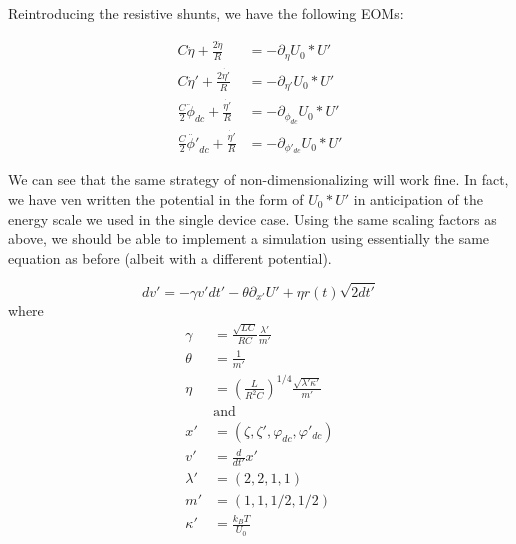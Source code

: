 \documentclass[paper=a4, twocolumn, fontsize=10pt]{article} %
\numberwithin{equation}{section} %
\numberwithin{figure}{section} %
\numberwithin{table}{section} %
\begin{document}
Reintroducing the resistive shunts, we have the following EOMs:

\begin{align*}
    C \ddot{\eta} + \frac{2 \dot{\eta}}{R} &= -\partial_{\eta} U_0 * U' \\
    C \ddot{\eta}' + \frac{2 \dot{\eta'}}{R}  &= -\partial_{\eta'} U_0 * U' \\
\frac{C}{2} \ddot{\phi}_{dc} + \frac{\dot{\eta'}}{R} &= -\partial_{\phi_{dc}} U_0 * U' \\
\frac{C}{2} \ddot{\phi'}_{dc} + \frac{\dot{\eta'}}{R} &= -\partial_{\phi'_{dc}} U_0 * U'
\end{align*}

We can see that the same strategy of non-dimensionalizing will work fine. In fact, we have ven written the potential in the form of $U_0 * U'$ in anticipation of the energy scale we used in the single device case. Using the same scaling factors as above, we should be able to implement a simulation using essentially the same equation as before (albeit with a different potential).

\[ dv' = -\gamma v' dt' - \theta \partial_{x'} U' + \eta r(t) \sqrt{2dt'} \]
where
\begin{align*}
    \gamma &=  \frac{\sqrt{LC} }{ RC} \frac{\lambda'}{m'}  \\
    \theta &= \frac{1 }{ m'} \\
    \eta &= \left(  \frac{L}{R^2 C} \right)^{1/4} \frac{\sqrt{\lambda'\kappa'}}{m'} \\
    &\text{and} \\
    x' &= (\zeta, \zeta', \varphi_{dc}, \varphi'_{dc}) \\
    v' &= \frac{d}{dt'} x' \\
    \lambda' &= (2, 2, 1, 1) \\
    m' &= ( 1, 1, 1/2, 1/2) \\
    \kappa' &= \frac{k_B T}{U_0}
\end{align*}
\end{document}
